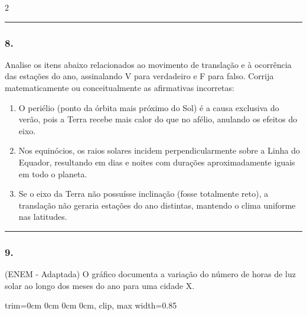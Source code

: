 \documentclass[twoside, 10pt, a4paper]{article}
\newlength{\espacoPreQuestao}
\newlength{\espacoQuestao}
\newlength{\espacoAlt}
\newcommand{\larguraTikz}{0.85\linewidth} %
\begin{document}
\begin{multicols*}{2}
\noindent\textcolor{CorLinha}{\rule{\linewidth}{0.5pt}} 
\par\vspace{\espacoPreQuestao}
\subsubsection*{8.} Analise os itens abaixo relacionados ao movimento de translação e à ocorrência das estações do ano, assinalando V para verdadeiro e F para falso. Corrija matematicamente ou conceitualmente as afirmativas incorretas:
\begin{enumerate}[label=\Roman*., itemsep=\espacoAlt]
    \item O periélio (ponto da órbita mais próximo do Sol) é a causa exclusiva do verão, pois a Terra recebe mais calor do que no afélio, anulando os efeitos do eixo.
    \item Nos equinócios, os raios solares incidem perpendicularmente sobre a Linha do Equador, resultando em dias e noites com durações aproximadamente iguais em todo o planeta.
    \item Se o eixo da Terra não possuísse inclinação (fosse totalmente reto), a translação não geraria estações do ano distintas, mantendo o clima uniforme nas latitudes.
\end{enumerate}
\par\vspace{\espacoQuestao}

\noindent\textcolor{CorLinha}{\rule{\linewidth}{0.5pt}} 
\par\vspace{\espacoPreQuestao}
\subsubsection*{9.} (ENEM - Adaptada) O gráfico documenta a variação do número de horas de luz solar ao longo dos meses do ano para uma cidade X.

\begin{center}
\begin{adjustbox}{trim=0cm 0cm 0cm 0cm, clip, max width=\larguraTikz}
\end{adjustbox}
\end{center}


\end{multicols*}
\end{document}
